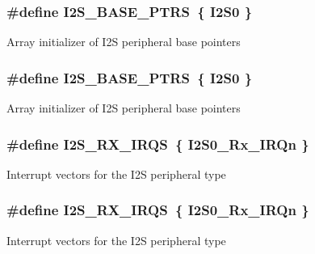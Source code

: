 \subsubsection[{\texorpdfstring{I2\+S\+\_\+\+B\+A\+S\+E\+\_\+\+P\+T\+RS}{I2S_BASE_PTRS}}]{\setlength{\rightskip}{0pt plus 5cm}\#define I2\+S\+\_\+\+B\+A\+S\+E\+\_\+\+P\+T\+RS~\{ {\bf I2\+S0} \}}\hypertarget{group__I2S__Peripheral__Access__Layer_gad4496321b78d6de21d7434afb80480b5}{}\label{group__I2S__Peripheral__Access__Layer_gad4496321b78d6de21d7434afb80480b5}
Array initializer of I2S peripheral base pointers 
\subsubsection[{\texorpdfstring{I2\+S\+\_\+\+B\+A\+S\+E\+\_\+\+P\+T\+RS}{I2S_BASE_PTRS}}]{\setlength{\rightskip}{0pt plus 5cm}\#define I2\+S\+\_\+\+B\+A\+S\+E\+\_\+\+P\+T\+RS~\{ {\bf I2\+S0} \}}\hypertarget{group__I2S__Peripheral__Access__Layer_gad4496321b78d6de21d7434afb80480b5}{}\label{group__I2S__Peripheral__Access__Layer_gad4496321b78d6de21d7434afb80480b5}
Array initializer of I2S peripheral base pointers 
\subsubsection[{\texorpdfstring{I2\+S\+\_\+\+R\+X\+\_\+\+I\+R\+QS}{I2S_RX_IRQS}}]{\setlength{\rightskip}{0pt plus 5cm}\#define I2\+S\+\_\+\+R\+X\+\_\+\+I\+R\+QS~\{ {\bf I2\+S0\+\_\+\+Rx\+\_\+\+I\+R\+Qn} \}}\hypertarget{group__I2S__Peripheral__Access__Layer_gaeca92f0fb02a87f382733e4349168b02}{}\label{group__I2S__Peripheral__Access__Layer_gaeca92f0fb02a87f382733e4349168b02}
Interrupt vectors for the I2S peripheral type 
\subsubsection[{\texorpdfstring{I2\+S\+\_\+\+R\+X\+\_\+\+I\+R\+QS}{I2S_RX_IRQS}}]{\setlength{\rightskip}{0pt plus 5cm}\#define I2\+S\+\_\+\+R\+X\+\_\+\+I\+R\+QS~\{ {\bf I2\+S0\+\_\+\+Rx\+\_\+\+I\+R\+Qn} \}}\hypertarget{group__I2S__Peripheral__Access__Layer_gaeca92f0fb02a87f382733e4349168b02}{}\label{group__I2S__Peripheral__Access__Layer_gaeca92f0fb02a87f382733e4349168b02}
Interrupt vectors for the I2S peripheral type 